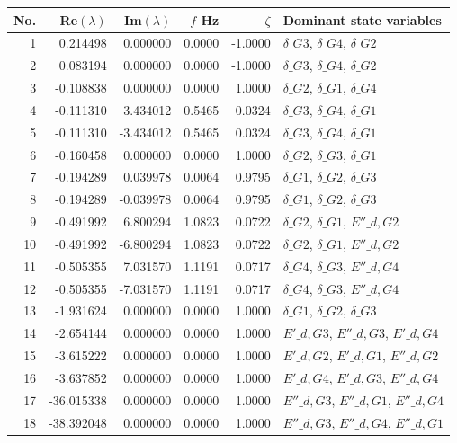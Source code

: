 \begingroup\scriptsize\setlength{\tabcolsep}{3pt}\renewcommand{\arraystretch}{0.86}
\begin{tabular}{r r r r r p{5.0cm}}\toprule
No. & Re$(\lambda)$ & Im$(\lambda)$ & $f$ Hz & $\zeta$ & Dominant state variables\\\midrule
1 & 0.214498 & 0.000000 & 0.0000 & -1.0000 & $\delta\_{G3}$, $\delta\_{G4}$, $\delta\_{G2}$\\
2 & 0.083194 & 0.000000 & 0.0000 & -1.0000 & $\delta\_{G3}$, $\delta\_{G4}$, $\delta\_{G2}$\\
3 & -0.108838 & 0.000000 & 0.0000 & 1.0000 & $\delta\_{G2}$, $\delta\_{G1}$, $\delta\_{G4}$\\
4 & -0.111310 & 3.434012 & 0.5465 & 0.0324 & $\delta\_{G3}$, $\delta\_{G4}$, $\delta\_{G1}$\\
5 & -0.111310 & -3.434012 & 0.5465 & 0.0324 & $\delta\_{G3}$, $\delta\_{G4}$, $\delta\_{G1}$\\
6 & -0.160458 & 0.000000 & 0.0000 & 1.0000 & $\delta\_{G2}$, $\delta\_{G3}$, $\delta\_{G1}$\\
7 & -0.194289 & 0.039978 & 0.0064 & 0.9795 & $\delta\_{G1}$, $\delta\_{G2}$, $\delta\_{G3}$\\
8 & -0.194289 & -0.039978 & 0.0064 & 0.9795 & $\delta\_{G1}$, $\delta\_{G2}$, $\delta\_{G3}$\\
9 & -0.491992 & 6.800294 & 1.0823 & 0.0722 & $\delta\_{G2}$, $\delta\_{G1}$, $E''\_{d,G2}$\\
10 & -0.491992 & -6.800294 & 1.0823 & 0.0722 & $\delta\_{G2}$, $\delta\_{G1}$, $E''\_{d,G2}$\\
11 & -0.505355 & 7.031570 & 1.1191 & 0.0717 & $\delta\_{G4}$, $\delta\_{G3}$, $E''\_{d,G4}$\\
12 & -0.505355 & -7.031570 & 1.1191 & 0.0717 & $\delta\_{G4}$, $\delta\_{G3}$, $E''\_{d,G4}$\\
13 & -1.931624 & 0.000000 & 0.0000 & 1.0000 & $\delta\_{G1}$, $\delta\_{G2}$, $\delta\_{G3}$\\
14 & -2.654144 & 0.000000 & 0.0000 & 1.0000 & $E'\_{d,G3}$, $E''\_{d,G3}$, $E'\_{d,G4}$\\
15 & -3.615222 & 0.000000 & 0.0000 & 1.0000 & $E'\_{d,G2}$, $E'\_{d,G1}$, $E''\_{d,G2}$\\
16 & -3.637852 & 0.000000 & 0.0000 & 1.0000 & $E'\_{d,G4}$, $E'\_{d,G3}$, $E''\_{d,G4}$\\
17 & -36.015338 & 0.000000 & 0.0000 & 1.0000 & $E''\_{d,G3}$, $E''\_{d,G1}$, $E''\_{d,G4}$\\
18 & -38.392048 & 0.000000 & 0.0000 & 1.0000 & $E''\_{d,G3}$, $E''\_{d,G4}$, $E''\_{d,G1}$\\

\end{tabular}
